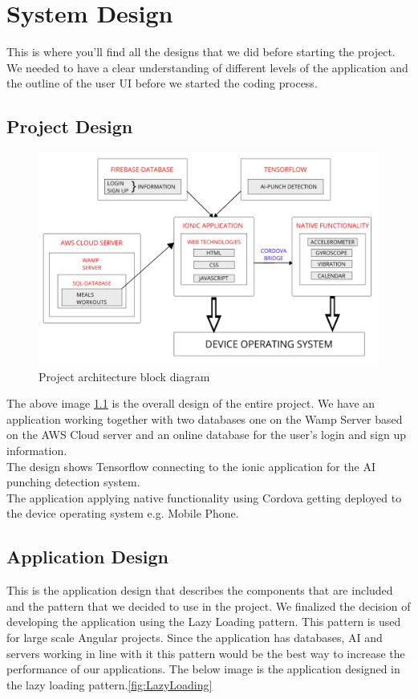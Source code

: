 \documentclass[a4paper,12pt]{report}
\begin{document}
\chapter{System Design}
This is where you’ll find all the designs that we did before starting the project. We needed to have a clear understanding of different levels of the application and the outline of the user UI before we started the coding process.

\section{Project Design}
\begin{figure}[h]
\includegraphics[scale=.37]{images/projectOverview.png}
\caption{Project architecture block diagram}
\label{fig:projectDiagram}
\end{figure}

The above image \ref{fig:projectDiagram} is the overall design of the entire project. We have an application working together with two databases one on the Wamp Server based on the AWS Cloud server and an online database for the user's login and sign up information.\\
The design shows Tensorflow connecting to the ionic application for the AI punching detection system.\\
The application applying native functionality using Cordova getting deployed to the device operating system e.g. Mobile Phone. 
\section{Application Design}
This is the application design that describes the components that are included and the pattern that we decided to use in the project.
We finalized the decision of developing the application using the Lazy Loading pattern. This pattern is used for large scale Angular projects.
Since the application has databases, AI and servers working in line with it this pattern would be the best way to increase the performance of our applications.
The below image is the application designed in the lazy loading pattern.\ref{fig:LazyLoading}
\end{document}
